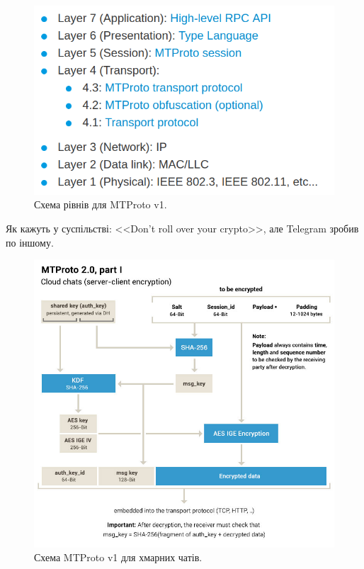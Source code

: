 \begin{figure}[ht]
        \centering
        \includegraphics[scale=0.37]{../IMAGES/mproto_layers.png}
        \caption{Схема рівнів для MTProto v1.}
        \label{mproto_layers}
\end{figure}

\begin{remark}
    Як кажуть у суспільстві: <<Don't roll over your crypto>>, але Telegram зробив по іншому.
\end{remark}

\begin{figure}[ht]
        \centering
        \includegraphics[scale=0.37]{../IMAGES/mproto1.jpeg}
        \caption{Схема MTProto v1 для хмарних чатів.}
        \label{mproto1}
\end{figure}

